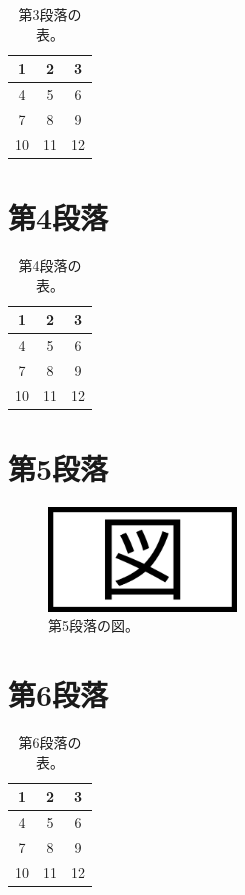 \documentclass[a4paper, platex, dvipdfmx]{jsarticle}
\begin{document}
\begin{table}[H]
  \centering
  \caption{第3段落の表。}
  \begin{tabular}{ccc}
    \hline
    1 & 2 & 3 \\\hline
    4 & 5 & 6\\
    7 & 8 & 9 \\
    10 & 11 & 12 \\\hline
  \end{tabular}
\end{table}

\section{第4段落}
\lipsum[4]

\begin{table}[H]
  \centering
  \caption{第4段落の表。}
  \begin{tabular}{ccc}
    \hline
    1 & 2 & 3 \\\hline
    4 & 5 & 6\\
    7 & 8 & 9 \\
    10 & 11 & 12 \\\hline
  \end{tabular}
\end{table}

\section{第5段落}
\lipsum[5]

\begin{figure}[H]
  \centering
  \includegraphics[width=5cm]{sample.png}
  \caption{第5段落の図。}
\end{figure}

\section{第6段落}
\lipsum[6]

\begin{table}[H]
  \centering
  \caption{第6段落の表。}
  \begin{tabular}{ccc}
    \hline
    1 & 2 & 3 \\\hline
    4 & 5 & 6\\
    7 & 8 & 9 \\
    10 & 11 & 12 \\\hline
  \end{tabular}
\end{table}
\end{document}
